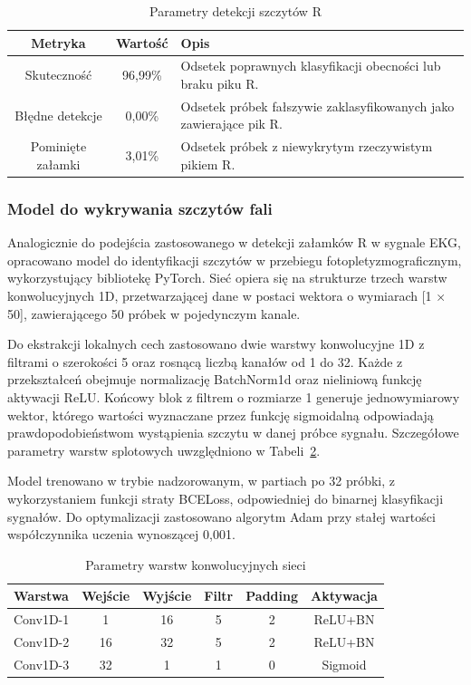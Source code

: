 \documentclass[journal]{IEEEtran}
\begin{document}
\begin{table}[ht]
\centering
\caption{Parametry detekcji szczytów R}
\label{tab:metrics}
\begin{tabular}{|c|c|p{4.6cm}|}
\hline
\textbf{Metryka} & \textbf{Wartość} & \textbf{Opis} \\
\hline
Skuteczność & 96,99\% & Odsetek poprawnych klasyfikacji obecności lub braku piku R. \\
\hline
Błędne detekcje & 0,00\% & Odsetek próbek fałszywie zaklasyfikowanych jako zawierające pik R. \\
\hline
Pominięte załamki & 3,01\% & Odsetek próbek z niewykrytym rzeczywistym pikiem R. \\
\hline
\end{tabular}
\end{table}

\subsubsection{Model do wykrywania szczytów fali}
Analogicznie do podejścia zastosowanego w detekcji załamków R w sygnale EKG, opracowano model do identyfikacji szczytów w przebiegu fotopletyzmograficznym, wykorzystujący bibliotekę PyTorch. Sieć opiera się na strukturze trzech warstw konwolucyjnych 1D, przetwarzającej dane w postaci wektora o wymiarach [1 × 50], zawierającego 50 próbek w pojedynczym kanale.

Do ekstrakcji lokalnych cech zastosowano dwie warstwy konwolucyjne 1D z filtrami o szerokości 5 oraz rosnącą liczbą kanałów od 1 do 32. Każde z przekształceń obejmuje normalizację BatchNorm1d oraz nieliniową funkcję aktywacji ReLU. Końcowy blok z filtrem o rozmiarze 1 generuje jednowymiarowy wektor, którego wartości wyznaczane przez funkcję sigmoidalną odpowiadają prawdopodobieństwom wystąpienia szczytu w danej próbce sygnału. Szczegółowe parametry warstw splotowych uwzględniono w Tabeli~\ref{tab:ppg_layers}.

Model trenowano w trybie nadzorowanym, w partiach po 32 próbki, z wykorzystaniem funkcji straty BCELoss, odpowiedniej do binarnej klasyfikacji sygnałów. Do optymalizacji zastosowano algorytm Adam przy stałej wartości współczynnika uczenia wynoszącej 0,001.

\begin{table}[ht]
\centering
\caption{Parametry warstw konwolucyjnych sieci}
\label{tab:ppg_layers}
\begin{tabular}{|l|c|c|c|c|c|}
\hline
\textbf{Warstwa} & \textbf{Wejście} & \textbf{Wyjście} & \textbf{Filtr} & \textbf{Padding} & \textbf{Aktywacja} \\
\hline
Conv1D-1 & 1 & 16 & 5 & 2 & ReLU+BN \\
Conv1D-2 & 16 & 32 & 5 & 2 & ReLU+BN \\
Conv1D-3 & 32 & 1 & 1 & 0 & Sigmoid \\
\hline
\end{tabular}
\end{table}
\end{document}
